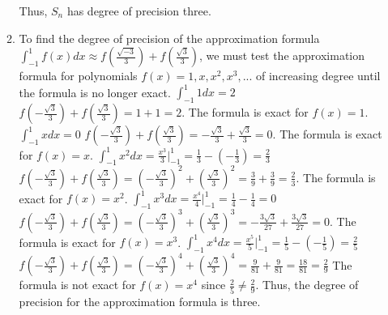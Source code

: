 \documentclass[12pt]{article}
\begin{document}
\begin{enumerate}[leftmargin=2em]
\begin{enumerate}[leftmargin=!]
        Thus, $S_n$ has degree of precision three.
        \item To find the degree of precision of the approximation formula
        \(\int _{-1}^{1}f(x)dx\approx f(\frac{\sqrt{-3}}{3})+f(\frac{\sqrt{3}}{3})\),
        we must test the approximation formula for polynomials \(f(x)=1,x,x^{2},x^{3},...\) of increasing degree until the formula is no longer exact.
        \(\int _{-1}^{1}1dx=2\)
        \(f(-\frac{\sqrt{3}}{3})+f(\frac{\sqrt{3}}{3})=1+1=2\).
        The formula is exact for \(f(x)=1\).
        \(\int _{-1}^{1}xdx=0\)
        \(f(-\frac{\sqrt{3}}{3})+f(\frac{\sqrt{3}}{3})=-\frac{\sqrt{3}}{3}+\frac{\sqrt{3}}{3}=0\).
        The formula is exact for \(f(x)=x\).
        \(\int _{-1}^{1}x^{2}dx=\frac{x^{3}}{3}\Big|_{-1}^{1}=\frac{1}{3}-(-\frac{1}{3})=\frac{2}{3}\)
        \(f(-\frac{\sqrt{3}}{3})+f(\frac{\sqrt{3}}{3})=(-\frac{\sqrt{3}}{3})^{2}+(\frac{\sqrt{3}}{3})^{2}=\frac{3}{9}+\frac{3}{9}=\frac{2}{3}\).
        The formula is exact for \(f(x)=x^{2}\).
        \(\int _{-1}^{1}x^{3}dx=\frac{x^{4}}{4}\Big|_{-1}^{1}=\frac{1}{4}-\frac{1}{4}=0\)
        \(f(-\frac{\sqrt{3}}{3})+f(\frac{\sqrt{3}}{3})=(-\frac{\sqrt{3}}{3})^{3}+(\frac{\sqrt{3}}{3})^{3}=-\frac{3\sqrt{3}}{27}+\frac{3\sqrt{3}}{27}=0\).
        The formula is exact for \(f(x)=x^{3}\).
        \(\int _{-1}^{1}x^{4}dx=\frac{x^{5}}{5}\Big|_{-1}^{1}=\frac{1}{5}-(-\frac{1}{5})=\frac{2}{5}\)
        \(f(-\frac{\sqrt{3}}{3})+f(\frac{\sqrt{3}}{3})=(-\frac{\sqrt{3}}{3})^{4}+(\frac{\sqrt{3}}{3})^{4}=\frac{9}{81}+\frac{9}{81}=\frac{18}{81}=\frac{2}{9}\)
        The formula is not exact for \(f(x)=x^{4}\) since \(\frac{2}{5}\ne \frac{2}{9}\).
        Thus, the degree of precision for the approximation formula is three.
    \end{enumerate}
\end{enumerate}
\end{document}
